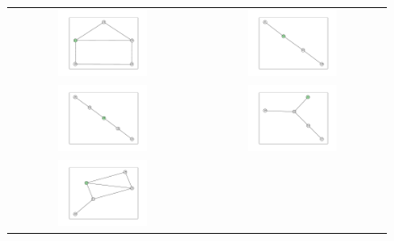 \documentclass[12pt, a4paper]{extarticle}
\begin{document}
\begin{figure}\centering\begin{tabularx}{\textwidth}{cc}
\includegraphics[width=0.5\textwidth]{task11-graphlets/5_18-25-22-23-24.pdf} &
\includegraphics[width=0.5\textwidth]{task11-graphlets/4_21-18-19-23.pdf} \\
\includegraphics[width=0.5\textwidth]{task11-graphlets/5_18-25-22-23-26.pdf} &
\includegraphics[width=0.5\textwidth]{task11-graphlets/5_16-17-18-19-23.pdf} \\
\includegraphics[width=0.5\textwidth]{task11-graphlets/5_21-25-20-23-24.pdf} &

\end{tabularx}
\end{figure}
\end{document}
